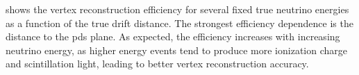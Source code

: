  shows the vertex reconstruction efficiency for several fixed true neutrino energies as a function of the true drift distance. The strongest efficiency dependence is the distance to the \gls{pds} plane. As expected, the efficiency increases with increasing neutrino energy, as higher energy events tend to produce more ionization charge and scintillation light, leading to better vertex reconstruction accuracy.
